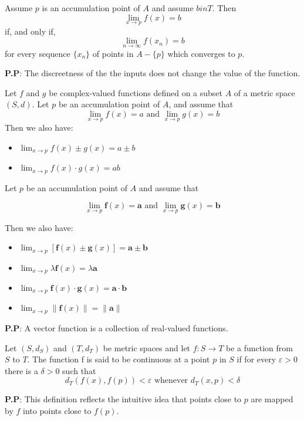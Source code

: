 \documentclass[10pt,a4paper]{book}
\begin{document}
\begin{Thm}
Assume $p$ is an accumulation point of $A$ and assume $b in T$. Then
$$\lim_{x \rightarrow p} f(x) =  b$$
if, and only if,
$$\lim_{n \rightarrow \infty} f(x_n) =  b$$
for every sequence $\{x_n\}$ of points in $A - \{ p\}$ which converges to $p$.


\end{Thm}
\noindent \textbf{P.P}: The discreetness of the the inputs does not change the value of the function.



\begin{Thm}
Let $f$ and $g$ be complex-valued functions defined on a subset $A$ of a metric space $(S, d)$. Let $p$ be an accumulation point of $A$, and assume that
$$\lim_{x \rightarrow p} f(x) = a \text{    and    } \lim_{x \rightarrow p} g(x) = b$$
Then we also have:
\begin{itemize}
    \item $\lim_{x \rightarrow p} f(x) \pm g(x) =  a \pm b$
    \item $\lim_{x \rightarrow p} f(x)\cdot g(x) =  ab$
\end{itemize}

\end{Thm}


\begin{Thm}
Let $p$ be an accumulation point of $A$ and assume that

$$\lim_{x \rightarrow p} \mathbf{f}(x) = \mathbf{a} \text{    and    } \lim_{x \rightarrow p} \mathbf{g}(x) = \mathbf{b}$$

Then we also have:
\begin{itemize}
    \item $\lim_{x \rightarrow p} [\mathbf{f}(x) \pm \mathbf{g}(x)] = \mathbf{a} \pm \mathbf{b}$
    \item $\lim_{x \rightarrow p} \lambda\mathbf{f}(x)  = \lambda \mathbf{a}$
    \item $\lim_{x \rightarrow p} \mathbf{f}(x) \cdot \mathbf{g}(x) = \mathbf{a} \cdot \mathbf{b}$
    \item $\lim_{x \rightarrow p} \lVert \mathbf{f}(x)\rVert  = \lVert\mathbf{a}\rVert$
\end{itemize}


\end{Thm}
\noindent \textbf{P.P}: A vector function is a collection of real-valued functions.



\begin{deff}
Let $(S, d_S)$ and $(T, d_T)$ be metric spaces and let $f : S \rightarrow T$ be a function from $S$ to $T$. The function f is said to be continuous at a point $p$ in $S$ if for every $\varepsilon > 0$ there is a $\delta > 0$ such that\\
$$d_T(f(x), f(p)) < \varepsilon \text{ whenever } d_T(x,p) < \delta $$

\end{deff}
\noindent \textbf{P.P}: This definition reflects the intuitive idea that points close to $p$ are mapped by $f$ into points close to $f(p)$. 
\end{document}
